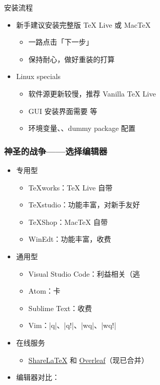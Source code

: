 \begin{frame}{安装流程}
\begin{itemize}
  \item 新手建议安装完整版 \TeX{} Live 或 Mac\TeX{}
    \begin{itemize}
      \item 一路点击「下一步」
      \item 保持耐心，做好重装的打算
    \end{itemize}
  \item<+-> Linux specials
    \begin{itemize}
      \item 软件源更新较慢，推荐 Vanilla \TeX{} Live
      \item GUI 安装界面需要  等
      \item 环境变量、、dummy package 配置
    \end{itemize}
\end{itemize}
\end{frame}

\begin{frame}[fragile]
\frametitle{神圣的战争——选择编辑器}
\begin{itemize}
  \item<+-> 专用型
    \begin{itemize}
      \item TeXworks：\TeX{} Live 自带 \faWindows{} \faApple{} \faLinux{}
      \item TeXstudio：功能丰富，对新手友好 \faWindows{} \faApple{} \faLinux{}
      \item TeXShop：Mac\TeX{} 自带 \faApple{}
      \item WinEdt：功能丰富，收费 \faWindows{}
    \end{itemize}
  \item<+-> 通用型
    \begin{itemize}
      \item Visual Studio Code：利益相关（逃
      \item Atom：卡
      \item Sublime Text：收费
      \item Vim：|q|、|q!|、|wq|、|wq!|
    \end{itemize}
  \item<+-> 在线服务
    \begin{itemize}
      \item \href{https://www.sharelatex.com}{\textcolor{酡红}{ShareLaTeX}} 和
            \href{https://www.overleaf.com}{\textcolor{松花绿}{Overleaf}}（现已合并）
    \end{itemize}
  \item<+-> 编辑器对比：
\end{itemize}
\end{frame}
